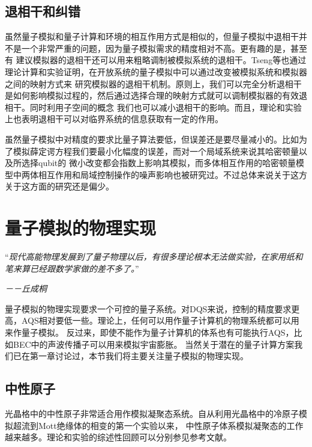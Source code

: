 \subsection{退相干和纠错}

虽然量子模拟和量子计算和环境的相互作用方式是相似的，但量子模拟中退相干并不是一个非常严重的问题，因为量子模拟需求的精度相对不高。更有趣的是，甚至有
建议模拟器的退相干还可以用来粗略调制被模拟系统的退相干\cite{Lloyd}。Tseng等也通过理论计算和实验证明\cite{deco}，在开放系统的量子模拟中可以通过改变被模拟系统和模拟器之间的映射方式来
研究模拟器的退相干机制。原则上，我们可以完全分析退相干是如何影响模拟过程的，然后通过选择合理的映射方式就可以调制模拟器的有效退相干。同时利用子空间的概念
我们也可以减小退相干的影响。而且，理论和实验上也表明退相干可以对临界系统的信息获取有一定的作用\cite{deco1,deco2}。

虽然量子模拟中对精度的要求比量子算法要低，但误差还是要尽量减小的。比如为了模拟薛定谔方程我们要最小化幅度的误差\cite{schro}，而对一个局域系统来说其哈密顿量以及所选择qubit的
微小改变都会指数上影响其模拟\cite{mon}，而多体相互作用的哈密顿量模型中两体相互作用和局域控制操作的噪声影响也被研究过\cite{dur}。不过总体来说关于这方关于这方面的研究还是偏少。

\section{量子模拟的物理实现}

 “\emph{现代高能物理发展到了量子物理以后，有很多理论根本无法做实验，在家用纸和笔来算已经跟数学家做的差不多了。}”

 \hspace{23em} \emph{－－丘成桐}

量子模拟的物理实现要求一个可控的量子系统。对DQS来说，控制的精度要求更高，AQS相对要低一些。理论上，任何可以用作量子计算机的物理系统都可以用来作量子模拟。
反过来，即使不能作为量子计算机的体系也有可能执行AQS，比如BEC中的声波传播子可以用来模拟宇宙膨胀\cite{cosmic}。 当然关于潜在的量子计算方案我们已在第一章讨论过，本节我们将主要关注量子模拟的物理实现。

\subsection{中性原子}

光晶格中的中性原子\cite{atomsim1}非常适合用作模拟凝聚态系统\cite{atomsim2,atomsim3}。自从利用光晶格中的冷原子模拟超流到Mott绝缘体的相变\cite{mott}的第一个实验以来，
中性原子体系模拟凝聚态的工作越来越多。理论和实验的综述性回顾可以分别参见参考文献\cite{atomsim2,atomsim1}。

